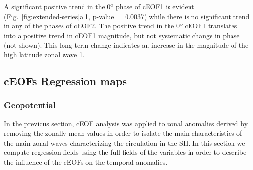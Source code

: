 \documentclass[pdflatex,lineno,sn-basic]{sn-jnl}
\theoremstyle{thmstyleone}%
\theoremstyle{thmstyletwo}%
\theoremstyle{thmstylethree}%
\begin{document}
A significant positive trend in the 0º phase of cEOF1 is evident (Fig.~\ref{fig:extended-series}a.1, p-value~= 0.0037) while there is no significant trend in any of the phases of cEOF2.
The positive trend in the 0º cEOF1 translates into a positive trend in cEOF1 magnitude, but not systematic change in phase (not shown).
This long-term change indicates an increase in the magnitude of the high latitude zonal wave 1.

\hypertarget{regressions}{%
\subsection{cEOFs Regression maps}\label{regressions}}

\hypertarget{geopotential}{%
\subsubsection{Geopotential}\label{geopotential}}

In the previous section, cEOF analysis was applied to zonal anomalies derived by removing the zonally mean values in order to isolate the main characteristics of the main zonal waves characterizing the circulation in the SH.
In this section we compute regression fields using the full fields of the variables in order to describe the influence of the cEOFs on the temporal anomalies.
\end{document}
